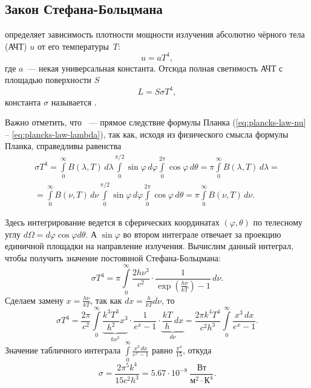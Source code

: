 \subsection{Закон Стефана-Больцмана}
\label{subsec:stef-boltz-law}
 определяет зависимость плотности мощности излучения абсолютно чёрного тела (АЧТ) $u$ от его температуры~$T$:
\begin{equation}
    u = a T^4,
\end{equation}
где $a$~--- некая универсальная константа.
Отсюда полная светимость АЧТ с площадью поверхности $S$
\begin{equation}
    L = S \sigma T^4,
    \label{eq:steff-bol-law}
\end{equation}
константа $\sigma$ называется .

Важно отметить, что ~--- прямое следствие формулы Планка (\ref{eq:plancks-law-nu} -- \ref{eq:plancks-law-lambda}), так как, исходя из физического смысла формулы Планка, справедливы равенства
\begin{multline}
    \sigma T^4
    = \int\limits^\infty_0 B(\lambda, T) \,d \lambda \int\limits_0^{\pi/2} \sin \varphi \,d \varphi \int\limits_0^{2\pi} \cos \varphi \,d \theta
    = \pi \int\limits^\infty_0 B(\lambda, T) \,d \lambda =\\
    = \int\limits^\infty_0 B(\nu, T) \,d \nu \int\limits_0^{\pi/2} \sin \varphi \,d \varphi \int\limits_0^{2\pi} \cos \varphi \,d \theta
    = \pi \int\limits^\infty_0 B(\nu, T) \,d \nu.
\end{multline}

Здесь интегрирование ведется в сферических координатах $(\varphi, \theta)$ по телесному углу $d\Omega = d\varphi \cos \varphi d\theta$. А $\sin \varphi$ во втором интеграле отвечает за проекцию единичной площадки на направление излучения. Вычислим данный интеграл, чтобы получить значение постоянной Стефана-Больцмана:
\begin{equation*}
    \sigma T^4 = \pi \int\limits_0^{\infty} \frac{2h\nu^3}{c^2}\cdot \frac{1}{\exp\left(\frac{h\nu}{kT}\right)-1} \,d \nu.
\end{equation*}
Сделаем замену $x = \frac{h \nu}{k T}$, так как $dx = \frac{h}{k T} d\nu$, то
\begin{equation*}
    \sigma T^4 = \frac{2\pi}{c^2}  \int\limits_0^{\infty} \underbrace{\frac{k^3 T^3}{h^2} x^3}_{h\nu^3} \cdot \frac{1}{e^x - 1} \cdot \underbrace{\frac{kT}{h} \,d x}_{d\nu} = \frac{2 \pi k^4 T^4}{c^2 h^3} \int\limits_0^{\infty} \frac{x^3 \,d x}{e^x - 1}.
\end{equation*}
Значение табличного интеграла $\int\limits_0^{\infty} \frac{x^3 \,d x}{e^x - 1}$ равно $\frac{\pi^4}{15}$, откуда
\begin{equation*}
    \sigma = \frac{2 \pi^5 k^4}{15 c^2 h^3} = 5.67 \cdot 10^{-8}~\frac{\text{Вт}}{\text{м}^2 \cdot \text{К}^4}.
\end{equation*}

